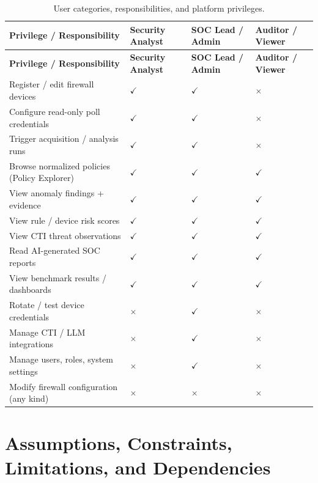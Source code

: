 \documentclass[12pt,a4paper]{report}
\renewcommand{\_}{\textunderscore\allowbreak}
\newcommand{\hrow}{}
\newcommand{\hcell}[1]{\textbf{#1}}
\newcommand{\altrow}{}
\begin{document}
{\small
\setlength{\tabcolsep}{4pt}
\begin{longtable}{L{6.0cm} C{2.8cm} C{2.8cm} C{2.8cm}}
\caption{User categories, responsibilities, and platform privileges.}\label{tab:ch3-privileges}\\
\hline
\hcell{Privilege / Responsibility} & \hcell{Security Analyst} & \hcell{SOC Lead / Admin} & \hcell{Auditor / Viewer} \\
\hline
\endfirsthead
\hline
\hcell{Privilege / Responsibility} & \hcell{Security Analyst} & \hcell{SOC Lead / Admin} & \hcell{Auditor / Viewer} \\
\hline
\endhead
\hline
\endfoot
\hline
\endlastfoot
\hrow Register / edit firewall devices & $\checkmark$ & $\checkmark$ & $\times$ \\
\altrow Configure read-only poll credentials & $\checkmark$ & $\checkmark$ & $\times$ \\
\hrow Trigger acquisition / analysis runs & $\checkmark$ & $\checkmark$ & $\times$ \\
\altrow Browse normalized policies (Policy Explorer) & $\checkmark$ & $\checkmark$ & $\checkmark$ \\
\hrow View anomaly findings + evidence & $\checkmark$ & $\checkmark$ & $\checkmark$ \\
\altrow View rule / device risk scores & $\checkmark$ & $\checkmark$ & $\checkmark$ \\
\hrow View CTI threat observations & $\checkmark$ & $\checkmark$ & $\checkmark$ \\
\altrow Read AI-generated SOC reports & $\checkmark$ & $\checkmark$ & $\checkmark$ \\
\hrow View benchmark results / dashboards & $\checkmark$ & $\checkmark$ & $\checkmark$ \\
\altrow Rotate / test device credentials & $\times$ & $\checkmark$ & $\times$ \\
\hrow Manage CTI / LLM integrations & $\times$ & $\checkmark$ & $\times$ \\
\altrow Manage users, roles, system settings & $\times$ & $\checkmark$ & $\times$ \\
\hrow Modify firewall configuration (any kind) & $\times$ & $\times$ & $\times$ \\
\end{longtable}
}

\section{Assumptions, Constraints, Limitations, and Dependencies}
\label{sec:ch3-acld}
\end{document}
